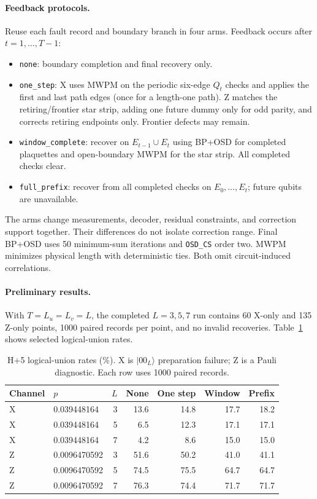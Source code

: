 \documentclass[11pt]{article}
\theoremstyle{definition}
\begin{document}
\paragraph{Feedback protocols.}
Reuse each fault record and boundary branch in four arms. Feedback occurs
after $t=1,\ldots,T-1$:
\begin{itemize}[nosep]
\item \texttt{none}: boundary completion and final recovery only.
\item \texttt{one\_step}: X uses MWPM on the periodic six-edge $Q_t$
checks and applies the first and last path edges (once for a length-one
path). Z matches the retiring/frontier star strip, adding one future dummy
only for odd parity, and corrects retiring endpoints only. Frontier
defects may remain.
\item \texttt{window\_complete}: recover on $E_{t-1}\cup E_t$ using
BP+OSD for completed plaquettes and open-boundary MWPM for the star strip.
All completed checks clear.
\item \texttt{full\_prefix}: recover from all completed checks on
$E_0,\ldots,E_t$; future qubits are unavailable.
\end{itemize}
The arms change measurements, decoder, residual constraints, and correction
support together. Their differences do not isolate correction range.
Final BP+OSD uses 50 minimum-sum iterations and \texttt{OSD\_CS} order two.
MWPM minimizes physical length with deterministic ties. Both omit
circuit-induced correlations.

\paragraph{Preliminary results.}
With $T=L_u=L_v=L$, the completed $L=3,5,7$ run contains
60 X-only and 135 Z-only points,
1000 paired records per point, and no invalid recoveries.
Table~\ref{tab:h5-preliminary} shows selected logical-union rates.
\begin{table}[htbp]
\centering
\small
\begin{tabular}{llrrrrr}
\hline
Channel & $p$ & $L$ & None & One step & Window & Prefix \\
\hline
X & 0.039448164 & 3 & 13.6 & 14.8 & 17.7 & 18.2 \\
X & 0.039448164 & 5 & 6.5 & 12.3 & 17.1 & 17.1 \\
X & 0.039448164 & 7 & 4.2 & 8.6 & 15.0 & 15.0 \\
Z & 0.0096470592 & 3 & 51.6 & 50.2 & 41.0 & 41.1 \\
Z & 0.0096470592 & 5 & 74.5 & 75.5 & 64.7 & 64.7 \\
Z & 0.0096470592 & 7 & 76.3 & 74.4 & 71.7 & 71.7 \\
\hline
\end{tabular}
\caption{H+5 logical-union rates (\%). X is $|00_L\rangle$ preparation
failure; Z is a Pauli diagnostic. Each row uses 1000 paired records.}
\label{tab:h5-preliminary}
\end{table}
\end{document}

